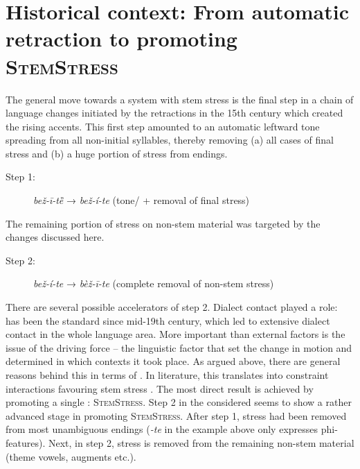 \documentclass[output=paper,nonflat,colorlinks,citecolor=brown,newtxmath]{langsci/langscibook}
\begin{document}
\section{Historical context: From automatic retraction to promoting \textsc{StemStress}} \label{sec:kager:5}

The general move towards a system with stem stress is the final step in a chain of language changes initiated by the  retractions in the 15th century \citep[162--168]{Bethin2006} which created the rising accents. This first step amounted to an automatic leftward tone spreading from all non-initial syllables, thereby removing (a) all cases of final stress and (b) a huge portion of stress from  endings.
\begin{description}
    \item[Step 1:] \textit{bež-ī-tȅ} → \textit{bež-í-te} (tone/ + removal of final stress)
\end{description}

\noindent The remaining portion of stress on non-stem material was targeted by the changes discussed here.

\begin{description}
    \item[Step 2:] \textit{bež-í-te} → \textit{bèž-ī-te}  (complete removal of non-stem stress)
\end{description}

\noindent There are several possible accelerators of step 2. Dialect contact played a role:  has been the standard since mid-19th century, which led to extensive dialect contact in the whole language area. More important than external factors is the issue of the driving force – the linguistic factor that set the change in motion and determined in which contexts it took place. As argued above, there are general reasons behind this  in terms of . In  literature, this translates into constraint interactions favouring stem stress \citep[e.g.][]{Revithiadou1999, Alderete2001, Kager2000}. The most direct result is achieved by promoting a single : \textsc{StemStress}.
Step 2 in the considered  seems to show a rather advanced stage in promoting \textsc{StemStress}. After step 1, stress had been removed from most unambiguous  endings (\textit{-te} in the example above only expresses phi-features). Next, in step 2, stress is removed from the remaining non-stem material (theme vowels, augments etc.).
\end{document}
